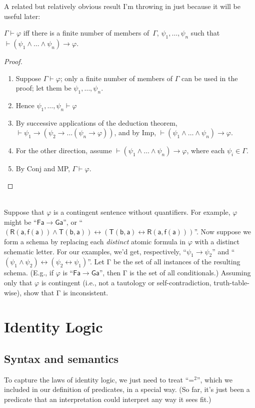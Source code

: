 \documentclass[12pt]{report}
\theoremstyle{nonumberplain}
\newtheorem{proof}{Proof}
\newcounter{hwex}
\newenvironment{hw}{\refstepcounter{hwex}\bigskip\noindent\fbox{\textsc{~Homework~\arabic{hwex}~}}\\[0.2\baselineskip]
\noindent}{}
\renewcommand{\o}[1]{\mathsf{#1}}
\begin{document}
A related but relatively obvious result I'm throwing in just because it will be useful later:

\begin{mt}\label{conditionalization}
$Γ ⊢ φ$ iff there is a finite number of members of \,$Γ$, $ψ_1, \dotsc, ψ_n$ such that $⊢ (ψ_1 ∧ \dots ∧ ψ_n) → φ$.
\end{mt}
\begin{proof}
\begin{enumerate}
\item Suppose $Γ ⊢ φ$; only a finite number of members of $Γ$ can be used in the proof; let them be $ψ_1, \dotsc, ψ_n$.
\item Hence $ψ_1, \dotsc, ψ_n ⊢ φ$
\item By successive applications of the deduction theorem, $⊢ ψ_1 → (ψ_2 → \dotsc (ψ_n → φ))$, and by Imp, $⊢ (ψ_1 ∧ \dots ∧ ψ_n) → φ$.
\item For the other direction, assume $⊢ (ψ_1 ∧ \dots ∧ ψ_n) → φ$, where each $ψ_i ∈ Γ$.
\item By Conj and MP, $Γ ⊢ φ$.
\end{enumerate}
\end{proof}

\begin{hw}
Suppose that $φ$ is a contingent sentence without quantifiers. For example, $φ$ might be ``$\o{Fa} → \o{Ga}$'', or ``$(\o{R}(\o{a},\o{f(a)}) ∧ \o{T}(\o{b},\o{a})) ↔ (\o{T}(\o{b},\o{a}) ↔ \o{R}(\o{a},\o{f(a)}))$''. Now suppose we form a schema by replacing each \emph{distinct} atomic formula in $φ$ with a distinct schematic letter. For our examples, we'd get, respectively, ``$ψ_1 → ψ_2$'' and ``$(ψ_1 ∧ ψ_2) ↔ (ψ_2 ↔ ψ_1)$''. Let Γ be the set of all instances of the resulting schema. (E.g., if $φ$ is ``$\o{Fa} → \o{Ga}$'', then Γ is the set of all conditionals.) Assuming only that $φ$ is contingent (i.e., not a tautology or self-contradiction, truth-table-wise), show that Γ is inconsistent.
\end{hw}

\section{Identity Logic}

\subsection*{Syntax and semantics}

To capture the laws of identity logic, we just need to treat ``=$^2$'', which we included in our definition of predicates, in a special way. (So far, it's just been a predicate that an interpretation could interpret any way it sees fit.)
\end{document}
